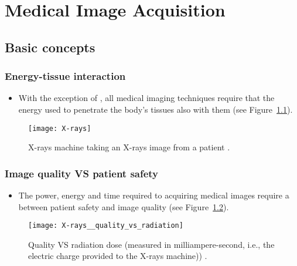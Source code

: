 \part{Medical Image Acquisition}

\chapter{Basic concepts}

\section{Energy-tissue interaction}
\begin{itemize}
\item With the exception of , all medical imaging
  techniques require that the energy used to penetrate the body's
  tissues also  with them \cite{bushberg2011essential} (see
  Figure~\ref{fig:X-rays}).
\end{itemize}
\vspace{-5ex}
\begin{figure}[!h]
  \centering
  \texttt{[image: X-rays]}
  \caption{X-rays machine taking an X-rays image from a
    patient \cite{CC2025Xray}.\label{fig:X-rays}}
\end{figure}

\section{Image quality VS patient safety}
\begin{itemize}
\item The power, energy and time required to acquiring medical images
  require a  between patient safety and image quality
  \cite{bushberg2011essential} (see
  Figure~\ref{fig:quality_vs_radiation}).
\end{itemize}
\vspace{-3ex}
\begin{figure}[!h]
  \centering
  \texttt{[image: X-rays\_\_quality\_vs\_radiation]}
  \caption{Quality VS radiation dose (measured in milliampere-second,
    i.e., the electric charge provided to the X-rays
    machine))
    \cite{huda2015radiographic}.\label{fig:quality_vs_radiation}}
\end{figure}

